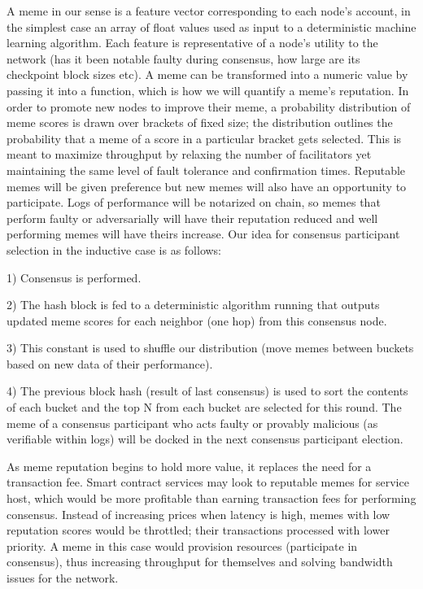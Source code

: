 \documentclass{article}
\begin{document}
A meme in our sense is a feature vector corresponding to each node's account, in the simplest case an array of float values used as input to a deterministic machine learning algorithm. Each feature is representative of a node's utility to the network (has it been notable faulty during consensus, how large are its checkpoint block sizes etc). A meme can be transformed into a numeric value by passing it into a function, which is how we will quantify a meme's reputation. In order to promote new nodes to improve their meme, a probability distribution of meme scores is drawn over brackets of fixed size; the distribution outlines the probability that a meme of a score in a particular bracket gets selected. This is meant to maximize throughput by relaxing the number of facilitators yet maintaining the same level of fault tolerance and confirmation times. Reputable memes will be given preference but new memes will also have an opportunity to participate. Logs of performance will be notarized on chain, so memes that perform faulty or adversarially will have their reputation reduced and well performing memes will have theirs increase. Our idea for consensus participant selection in the inductive case is as follows:

1) Consensus is performed. 

2) The hash block is fed to a deterministic algorithm running that outputs updated meme scores for each neighbor (one hop) from this consensus node. 

3) This constant is used to shuffle our distribution (move memes between buckets based on new data of their performance). 

4) The previous block hash (result of last consensus) is used to sort the contents of each bucket and the top N from each bucket are selected for this round. The meme of a consensus participant who acts faulty or provably malicious (as verifiable within logs) will be docked in the next consensus participant election.

As meme reputation begins to hold more value, it replaces the need for a transaction fee. Smart contract services may look to reputable memes for service host, which would be more profitable than earning transaction fees for performing consensus. Instead of increasing prices when latency is high, memes with low reputation scores would be throttled; their transactions processed with lower priority. A meme in this case would provision resources (participate in consensus), thus increasing throughput for themselves and solving bandwidth issues for the network. 
\end{document}

